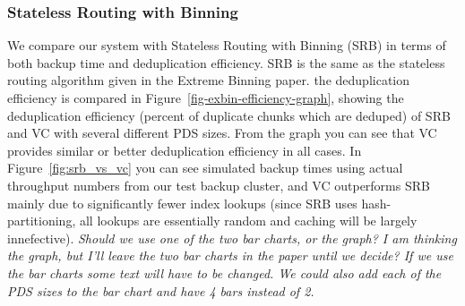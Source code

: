 \subsubsection{Stateless Routing with Binning}
We compare our system with Stateless Routing with Binning (SRB) in terms of
both backup time and deduplication efficiency. SRB is the same as the stateless
routing algorithm given in the Extreme Binning\cite{??} paper. the
deduplication efficiency is compared in
Figure~\ref{fig-exbin-efficiency-graph}, showing the deduplication efficiency
(percent of duplicate chunks which are deduped) of SRB and VC with several
different PDS sizes. From the graph you can see that VC provides similar or
better deduplication efficiency in all cases. In Figure~\ref{fig:srb_vs_vc} you
can see simulated backup times using actual throughput numbers from our test
backup cluster, and VC outperforms SRB mainly due to significantly fewer index
lookups (since SRB uses hash-partitioning, all lookups are essentially random
and caching will be largely innefective).  \emph{Should we use one of the two
bar charts, or the graph? I am thinking the graph, but I'll leave the two bar
charts in the paper until we decide? If we use the bar charts some text will
have to be changed. We could also add each of the PDS sizes to the bar chart
and have 4 bars instead of 2.}
